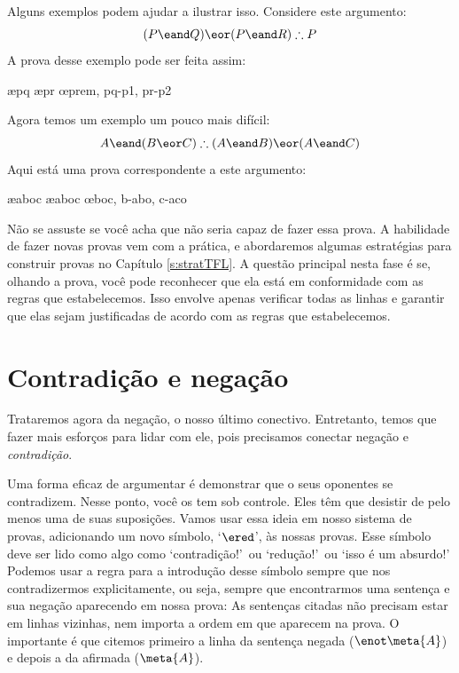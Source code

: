 Alguns exemplos podem ajudar a ilustrar isso. Considere este argumento:
$$(P \eand Q) \eor (P \eand R) \therefore P$$
A prova desse exemplo pode ser feita assim:
	\begin{fitchproof}
			\open
				\ae{pq}
			\close
			\open
				\ae{pr}
			\close
		\oe{prem, pq-p1, pr-p2}
	\end{fitchproof}
Agora temos  um exemplo um pouco mais difícil:  
	$$ A \eand (B \eor C) \therefore (A \eand B) \eor (A \eand C)$$
Aqui está uma prova correspondente a este argumento:
	\begin{fitchproof}
		\hypo{aboc}{A \eand (B \eor C)}
		\ae{aboc}
		\ae{aboc}
		\open
			\hypo{b}{B}
			\ai{a,b}
			\have{abo}{(A \eand B) \eor (A \eand C)}\oi{ab}
		\close
		\open
			\hypo{c}{C}
			\ai{a,c}
			\have{aco}{(A \eand B) \eor (A \eand C)}\oi{ac}
		\close
	\oe{boc, b-abo, c-aco}
	\end{fitchproof}
 

Não se assuste se você acha que não seria capaz de fazer essa prova. A habilidade de fazer novas provas vem com a prática, e abordaremos algumas estratégias para construir provas no Capítulo \ref{s:stratTFL}. A questão principal nesta fase é se, olhando a prova, você pode reconhecer que ela está em conformidade com as regras que estabelecemos.  Isso envolve apenas verificar todas as linhas e garantir que elas sejam justificadas de acordo com as regras que estabelecemos.


\section{Contradição e negação}

Trataremos agora da negação, o nosso  último conectivo. Entretanto, temos que fazer mais esforços para lidar com ele, pois precisamos conectar negação e  \emph{contradição}. 

Uma forma eficaz de argumentar é demonstrar que o seus oponentes se contradizem. Nesse ponto, você os tem sob controle. Eles têm que desistir de pelo menos uma de suas suposições. Vamos usar essa ideia em nosso sistema de provas, adicionando um novo símbolo, `$\ered$', às nossas provas. Esse símbolo deve ser lido como algo como `contradição!'\ ou `redução!'\ ou `isso é um absurdo!'  Podemos usar   a regra para a introdução desse símbolo sempre que nos contradizermos explicitamente, ou seja, sempre que encontrarmos uma sentença e sua negação aparecendo em nossa prova:
As sentenças citadas não precisam estar em linhas vizinhas, nem importa a ordem em que aparecem na prova. O importante é que citemos primeiro a linha da sentença negada ($\enot\meta{A}$) e depois a da afirmada ($\meta{A}$). 

